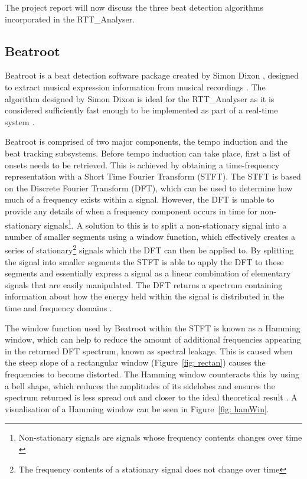 \documentclass[a4paper, 11pt]{article}
\begin{document}
The project report will now discuss the three beat detection algorithms incorporated in the RTT\_Analyser.

\subsection{Beatroot}
Beatroot is a beat detection software package created by Simon Dixon \cite{dixon1}, designed to extract musical expression information from musical recordings \cite{dixon3}. The algorithm designed by Simon Dixon is ideal for the RTT\_Analyser as it is considered sufficiently fast enough to be implemented as part of a real-time system \cite{dixon4}.\par

Beatroot is comprised of two major components, the tempo induction and the beat tracking subsystems. Before tempo induction can take place, first a list of onsets needs to be retrieved\cite{dixon4}. This is achieved by obtaining a time-frequency representation with a Short Time Fourier Transform (STFT). The STFT is based on the Discrete Fourier Transform (DFT), which can be used to determine how much of a frequency exists within a signal. However, the DFT is unable to provide any details of when a frequency component occurs in time for non-stationary signals\footnote{Non-stationary signals are signals whose frequency contents changes over time \cite{polikapt2}}. A solution to this is to split a non-stationary signal into a number of smaller segments using a window function, which effectively creates a series of stationary\footnote{The frequency contents of a stationary signal does not change over time} signals which the DFT can then be applied to. By splitting the signal into smaller segments the STFT is able to apply the DFT to these segments and essentially express a signal as a linear combination of elementary signals that are easily manipulated. The DFT returns a spectrum containing information about how the energy held within the signal is distributed in the time and frequency domains \cite{tzane2}.\par

The window function used by Beatroot within the STFT is known as a Hamming window, which can help to reduce the amount of additional frequencies appearing in the returned DFT spectrum, known as spectral leakage. This is caused when the steep slope of a rectangular window (Figure~\ref{fig: rectan}) causes the frequencies to become distorted. The Hamming window counteracts this by using a bell shape, which reduces the amplitudes of its sidelobes \cite{lyons} and ensures the spectrum returned is less spread out and closer to the ideal theoretical result \cite{tzane2}. A visualisation of a Hamming window can be seen in Figure~\ref{fig: hamWin}. 
\end{document}
